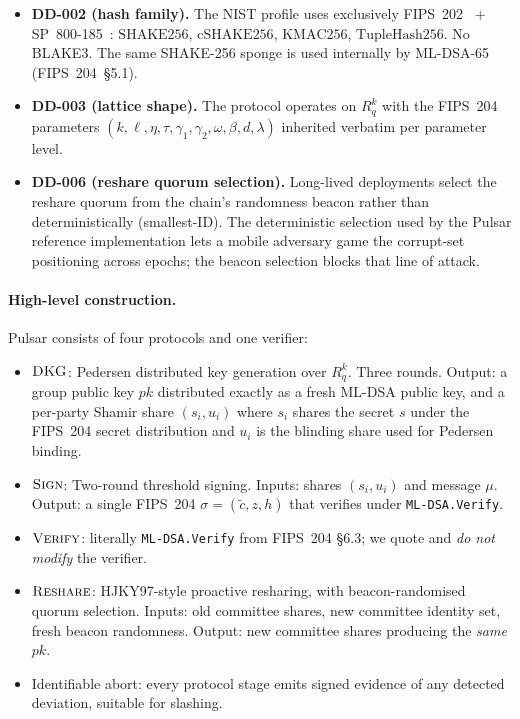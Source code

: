 \documentclass[11pt,a4paper]{article}
\theoremstyle{definition}
\theoremstyle{remark}
\newcommand{\Rq}{R_q}
\newcommand{\SHAKE}{\mathrm{SHAKE256}}
\newcommand{\cSHAKE}{\mathrm{cSHAKE256}}
\newcommand{\KMAC}{\mathrm{KMAC256}}
\newcommand{\TupleHash}{\mathrm{TupleHash256}}
\newcommand{\Sign}{\textsc{Sign}}
\newcommand{\Verify}{\textsc{Verify}}
\newcommand{\DKG}{\textsc{DKG}}
\newcommand{\Reshare}{\textsc{Reshare}}
\begin{document}
\begin{itemize}[leftmargin=*]
\item \textbf{DD-002 (hash family).} The NIST profile uses
exclusively FIPS~202~\cite{nist-fips202} +
SP~800-185~\cite{nist-sp800-185}: $\SHAKE$, $\cSHAKE$, $\KMAC$,
$\TupleHash$. No BLAKE3. The same SHAKE-256 sponge is used
internally by ML-DSA-65 (FIPS~204~\S5.1).
\item \textbf{DD-003 (lattice shape).} The protocol operates on
$\Rq^k$ with the FIPS~204 parameters $(k, \ell, \eta, \tau, \gamma_1,
\gamma_2, \omega, \beta, d, \lambda)$ inherited verbatim per
parameter level.
\item \textbf{DD-006 (reshare quorum selection).} Long-lived
deployments select the reshare quorum from the chain's randomness
beacon rather than deterministically (smallest-ID). The deterministic
selection used by the Pulsar reference implementation lets a mobile
adversary game the corrupt-set positioning across epochs; the beacon
selection blocks that line of attack.
\end{itemize}

\paragraph{High-level construction.}
Pulsar consists of four protocols and one verifier:

\begin{itemize}[leftmargin=*]
\item $\DKG$: Pedersen distributed key generation over $\Rq^k$.
Three rounds. Output: a group public key $\mathit{pk}$ distributed
exactly as a fresh ML-DSA public key, and a per-party Shamir share
$(s_i, u_i)$ where $s_i$ shares the secret $s$ under the FIPS~204
secret distribution and $u_i$ is the blinding share used for
Pedersen binding.
\item $\Sign$: Two-round threshold signing. Inputs: shares
$(s_i, u_i)$ and message $\mu$. Output: a single FIPS~204
$\sigma = (\tilde c, z, h)$ that verifies under \texttt{ML-DSA.Verify}.
\item $\Verify$: literally \texttt{ML-DSA.Verify} from FIPS~204
\S6.3; we quote and \emph{do not modify} the verifier.
\item $\Reshare$: HJKY97-style proactive resharing, with
beacon-randomised quorum selection. Inputs: old committee shares,
new committee identity set, fresh beacon randomness.
Output: new committee shares producing the \emph{same} $\mathit{pk}$.
\item Identifiable abort: every protocol stage emits signed evidence
of any detected deviation, suitable for slashing.
\end{itemize}
\end{document}
